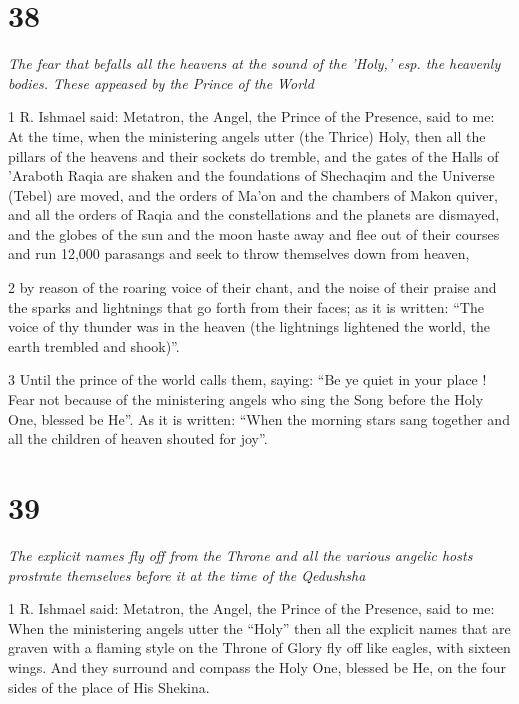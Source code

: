 \chapter{38}

\par \textit{The fear that befalls all the heavens at the sound of the 'Holy,' esp. the heavenly bodies. These appeased by the Prince of the World}

\par 1 R. Ishmael said: Metatron, the Angel, the Prince of the Presence, said to me: At the time, when the ministering angels utter (the Thrice) Holy, then all the pillars of the heavens and their sockets do tremble, and the gates of the Halls of 'Araboth Raqia are shaken and the foundations of Shechaqim and the Universe (Tebel) are moved, and the orders of Ma'on and the chambers of Makon quiver, and all the orders of Raqia and the constellations and the planets are dismayed, and the globes of the sun and the moon haste away and flee out of their courses and run 12,000 parasangs and seek to throw themselves down from heaven,

\par 2 by reason of the roaring voice of their chant, and the noise of their praise and the sparks and lightnings that go forth from their faces; as it is written: “The voice of thy thunder was in the heaven (the lightnings lightened the world, the earth trembled and shook)”. 

\par 3 Until the prince of the world calls them, saying: “Be ye quiet in your place ! Fear not because of the ministering angels who sing the Song before the Holy One, blessed be He”. As it is written: “When the morning stars sang together and all the children of heaven shouted for joy”. 



\chapter{39}

\par \textit{The explicit names fly off from the Throne and all the various angelic hosts prostrate themselves before it at the time of the Qedushsha}

\par 1 R. Ishmael said: Metatron, the Angel, the Prince of the Presence, said to me: When the ministering angels utter the “Holy” then all the explicit names that are graven with a flaming style on the Throne of Glory fly off like eagles, with sixteen wings. And they surround and compass the Holy One, blessed be He, on the four sides of the place of His Shekina. 

